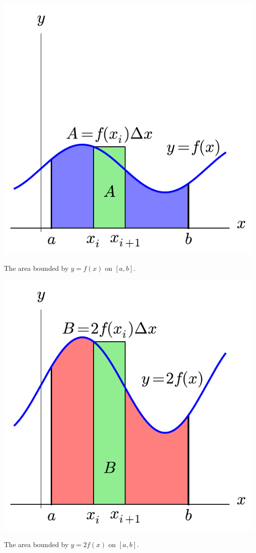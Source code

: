 \begin{enumerate}[1)]
\begin{marginfigure}[-9cm] %
\begin{center}
\includegraphics[scale=.5]{figs/4/4-3_ConstMulta.pdf}
\caption{The area bounded by $y = f(x)$ on $[a,b]$.} \label{fig:4-3_ConstMulta}
\end{center}
\end{marginfigure}

\begin{marginfigure}[-1cm] %
\begin{center}
\includegraphics[scale=.5]{figs/4/4-3_ConstMultb.pdf}
\caption{The area bounded by $y = 2f(x)$ on $[a,b]$.} \label{fig:4-3_ConstMultb}
\end{center}
\end{marginfigure}


\end{enumerate}
